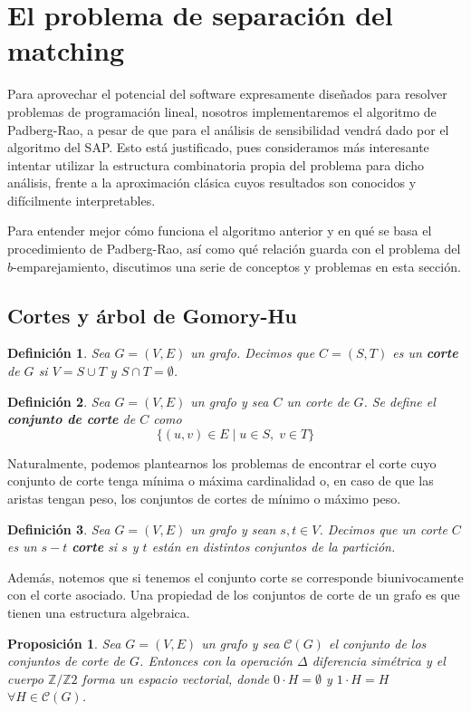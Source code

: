 \documentclass[twoside,a4paper,openright,12pt,tikz]{book}
\newtheorem{defi}{Definici\'on}[section]
\newtheorem{prop}{Proposici\'on}[section]
\newcommand{\Z}{\mathbb{Z}}
\begin{document}
\section{El problema de separación del matching}
Para aprovechar el potencial del software expresamente diseñados para resolver problemas de programación lineal, nosotros implementaremos el algoritmo de Padberg-Rao, a pesar de que para el análisis de sensibilidad vendrá dado por el algoritmo del SAP. Esto está justificado, pues consideramos más interesante intentar utilizar la estructura combinatoria propia del problema para dicho análisis, frente a la aproximación clásica cuyos resultados son conocidos y difícilmente interpretables.

Para entender mejor cómo funciona el algoritmo anterior y en qué se basa el procedimiento de Padberg-Rao, así como qué relación guarda con el problema del $b$-emparejamiento, discutimos una serie de conceptos y problemas en esta sección.

\subsection{Cortes y árbol de Gomory-Hu} 
\begin{defi}
Sea $G = (V,E)$ un grafo. Decimos que $C=(S,T)$ es un \textbf{corte} de $G$ si $V = S \cup T$ y $S\cap T = \emptyset$.
\end{defi}
\begin{defi}
Sea $G=(V,E)$ un grafo y sea $C$ un corte de $G$. Se define el \textbf{conjunto de corte} de $C$ como
$$
\{(u,v)\in E \mid u \in S,\; v\in T\}
$$ 
\end{defi}
Naturalmente, podemos plantearnos los problemas de encontrar el corte cuyo conjunto de corte tenga mínima o máxima cardinalidad o, en caso de que las aristas tengan peso, los conjuntos de cortes de mínimo o máximo peso. 

\begin{defi}
Sea $G=(V,E)$ un grafo y sean $s,t\in V$. Decimos que un corte $C$ es un $s-t$ \textbf{corte} si $s$ y $t$ están en distintos conjuntos de la partición. 
\end{defi}

Además, notemos que si tenemos el conjunto corte se corresponde biunivocamente con el corte asociado. Una propiedad de los conjuntos de corte de un grafo es que tienen una estructura algebraica.



\begin{prop}
Sea $G=(V,E)$ un grafo y sea $\mathcal{C}(G)$ el conjunto de los conjuntos de corte de $G$. Entonces con la operación $\Delta$ diferencia simétrica y el cuerpo $\Z/\Z2$ forma un espacio vectorial, donde $0\cdot H = \emptyset$ y $1\cdot H = H$ $\forall H \in \mathcal{C}(G)$.
\end{prop}
\end{document}
